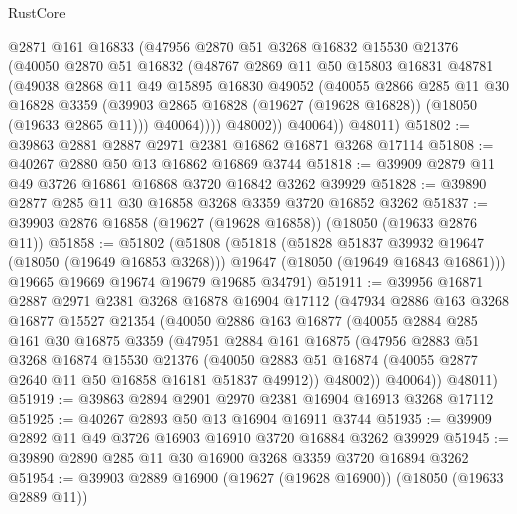 \begin{lexlean}{RustCore}
\begin{coremodule}
            @2871
            @161
            @16833
            (@47956
              @2870
              @51
              @3268
              @16832
              @15530
              @21376
              (@40050
                @2870
                @51
                @16832
                (@48767
                  @2869
                  @11
                  @50
                  @15803
                  @16831
                  @48781
                  (@49038
                    @2868
                    @11
                    @49
                    @15895
                    @16830
                    @49052
                    (@40055
                      @2866
                      @285
                      @11
                      @30
                      @16828
                      @3359
                      (@39903 @2865 @16828 (@19627 (@19628 @16828)) (@18050 (@19633 @2865 @11)))
                      @40064))))
              @48002))
          @40064))
      @48011)
@51802 := @39863 @2881 @2887 @2971 @2381 @16862 @16871 @3268 @17114
@51808 := @40267 @2880 @50 @13 @16862 @16869 @3744
@51818 := @39909 @2879 @11 @49 @3726 @16861 @16868 @3720 @16842 @3262 @39929
@51828 := @39890 @2877 @285 @11 @30 @16858 @3268 @3359 @3720 @16852 @3262
@51837 := @39903 @2876 @16858 (@19627 (@19628 @16858)) (@18050 (@19633 @2876 @11))
@51858 := @51802
    (@51808
      (@51818
        (@51828 @51837 @39932 @19647 (@18050 (@19649 @16853 @3268)))
        @19647
        (@18050 (@19649 @16843 @16861)))
      @19665
      @19669
      @19674
      @19679
      @19685
      @34791)
@51911 := @39956
    @16871
    @2887
    @2971
    @2381
    @3268
    @16878
    @16904
    @17112
    (@47934
      @2886
      @163
      @3268
      @16877
      @15527
      @21354
      (@40050
        @2886
        @163
        @16877
        (@40055
          @2884
          @285
          @161
          @30
          @16875
          @3359
          (@47951
            @2884
            @161
            @16875
            (@47956
              @2883
              @51
              @3268
              @16874
              @15530
              @21376
              (@40050 @2883 @51 @16874 (@40055 @2877 @2640 @11 @50 @16858 @16181 @51837 @49912))
              @48002))
          @40064))
      @48011)
@51919 := @39863 @2894 @2901 @2970 @2381 @16904 @16913 @3268 @17112
@51925 := @40267 @2893 @50 @13 @16904 @16911 @3744
@51935 := @39909 @2892 @11 @49 @3726 @16903 @16910 @3720 @16884 @3262 @39929
@51945 := @39890 @2890 @285 @11 @30 @16900 @3268 @3359 @3720 @16894 @3262
@51954 := @39903 @2889 @16900 (@19627 (@19628 @16900)) (@18050 (@19633 @2889 @11))

\end{coremodule}
\end{lexlean}
